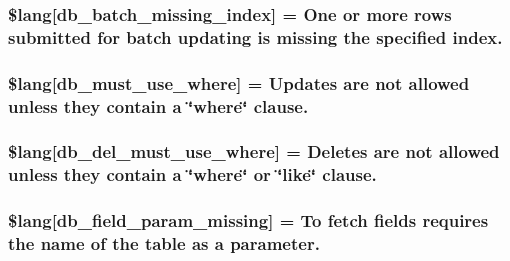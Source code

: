 \subsubsection[{\$lang}]{\setlength{\rightskip}{0pt plus 5cm}\$lang\mbox{[}\textquotesingle{}db\+\_\+batch\+\_\+missing\+\_\+index\textquotesingle{}\mbox{]} = \textquotesingle{}One or more rows submitted for batch updating is missing the specified index.\textquotesingle{}}\label{db__lang_8php_af946769a3dd5679c60e6f2ef5f7a5aa1}
\hypertarget{db__lang_8php_add4bfc65af76fda2c48fa6a2e8d2e506}{}
\subsubsection[{\$lang}]{\setlength{\rightskip}{0pt plus 5cm}\$lang\mbox{[}\textquotesingle{}db\+\_\+must\+\_\+use\+\_\+where\textquotesingle{}\mbox{]} = \textquotesingle{}Updates are not allowed unless they contain {\bf a} \char`\"{}where\char`\"{} clause.\textquotesingle{}}\label{db__lang_8php_add4bfc65af76fda2c48fa6a2e8d2e506}
\hypertarget{db__lang_8php_a256ae2de791e589ddc23012f74f390ea}{}
\subsubsection[{\$lang}]{\setlength{\rightskip}{0pt plus 5cm}\$lang\mbox{[}\textquotesingle{}db\+\_\+del\+\_\+must\+\_\+use\+\_\+where\textquotesingle{}\mbox{]} = \textquotesingle{}Deletes are not allowed unless they contain {\bf a} \char`\"{}where\char`\"{} or \char`\"{}like\char`\"{} clause.\textquotesingle{}}\label{db__lang_8php_a256ae2de791e589ddc23012f74f390ea}
\hypertarget{db__lang_8php_a9101352a8cd8c8f34a6b8b1e30c45d8a}{}
\subsubsection[{\$lang}]{\setlength{\rightskip}{0pt plus 5cm}\$lang\mbox{[}\textquotesingle{}db\+\_\+field\+\_\+param\+\_\+missing\textquotesingle{}\mbox{]} = \textquotesingle{}To fetch fields requires the name of the table as {\bf a} parameter.\textquotesingle{}}\label{db__lang_8php_a9101352a8cd8c8f34a6b8b1e30c45d8a}
\hypertarget{db__lang_8php_a77c256be8532e23e8463481f51732116}{}
